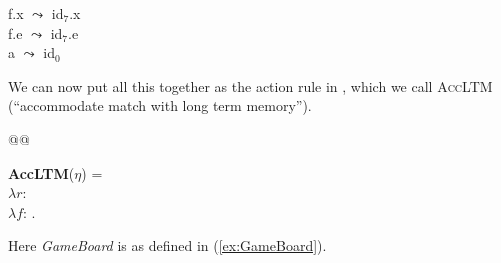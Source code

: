 \begin{ex}
\begin{subex}
\item  f.x $\leadsto$ id$_7$.x\\
       f.e $\leadsto$ id$_7$.e\\
       a $\leadsto$ id$_0$

\item {} 
 
\end{subex} 
   
\end{ex} 


 
We can now put all this together as the action rule in \nexteg{},
which we call \textsc{AccLTM} (``accommodate match with long term
memory'').

@@

\begin{ex}
\textbf{AccLTM}($\eta$) =\\ 
$\lambda r$:\\
\hspace*{1em}$\lambda
f$:  . \\
\hspace*{2em} 
\label{ex:AccLTM}
\end{ex}
\label{pg:inverserelabelling} 
Here \textit{GameBoard} is as defined in (\ref{ex:GameBoard}).
     
